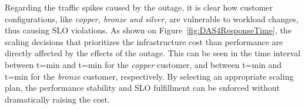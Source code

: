 

Regarding the traffic spikes caused by the outage, it is clear how customer configurations, like \emph{copper, bronze and silver}, are vulnerable to workload changes, thus causing SLO violations. As shown on Figure~\ref{fig:DAS4ResponseTime},  the scaling decisions that prioritizes the infrastructure cost than performance are directly affected by the effects of the outage. This can be seen in the time interval between t=min and t=min for the \emph{copper} customer, and between t=min and t=min for the \emph{bronze} customer, respectively. By selecting an appropriate scaling plan, the performance stability and SLO fulfillment can be enforced without dramatically raising the cost.






